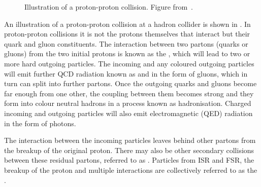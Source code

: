 \begin{figure}
\centering
        \vspace{-5mm}
    \caption[Illustration of a proton-proton collision.] {\small
Illustration of a proton-proton collision. Figure from~\cite{Campbell:2006wx}.
}
    \label{fig:pp-event}
\end{figure}

An illustration of a proton-proton collision at a hadron collider is shown in
. In proton-proton collisions it is not the
protons themselves that interact but their quark and gluon constituents. The interaction between two  partons (quarks or gluons) from the two initial
protons is known as the , which will lead to two or more
hard outgoing particles. The incoming and any coloured outgoing particles will
emit further QCD radiation known as  
and  in the form of gluons, which in turn can
split into further partons. Once the outgoing quarks and gluons become far enough from
one other, the coupling between them becomes strong and they form into colour neutral
hadrons in a process known as hadronisation. Charged incoming and outgoing
particles will also emit electromagnetic (QED) radiation in the form of photons. 

The interaction between the incoming
particles leaves behind other partons from the breakup of the original proton.
There may also be other secondary collisions between these residual partons,
referred to as . Particles from ISR and FSR, the breakup of the proton and
multiple interactions are collectively referred to as the .

